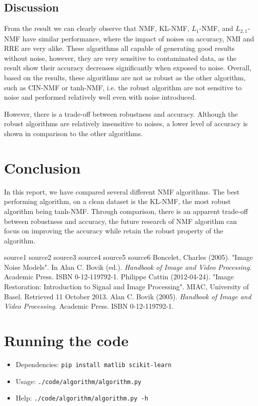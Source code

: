\documentclass{article} %
\begin{document}
\subsection{Discussion}
From the result we can clearly observe that NMF, KL-NMF, $L_1$-NMF, and $L_{2,1}$-NMF have similar performance, where the impact of noises on accuracy, NMI and RRE are very alike. These algorithms all capable of generating good results without noise, however, they are very sensitive to contaminated data, as the result show their accuracy decreases significantly when exposed to noise. Overall, based on the results, these algorithms are not as robust as the other algorithm, such as CIN-NMF or tanh-NMF, i.e. the robust algorithm are not sensitive to noise and performed relatively well even with noise introduced.

However, there is a trade-off between robustness and accuracy. Although the robust algorithms are relatively insensitive to noises, a lower level of accuracy is shown in comparison to the other algorithms.

\section{Conclusion}
In this report, we have compared several different NMF algorithms. The best performing algorithm, on a clean dataset is the KL-NMF, the most robust algorithm being tanh-NMF. Through comparison, there is an apparent trade-off between robustness and accuracy, the future research of NMF algorithm can focus on improving the accuracy while retain the robust property of the algorithm.


\begin{thebibliography}{99}
 source1
 source2
 source3
 source4
 source5
 source6
 Boncelet, Charles (2005). "Image Noise Models". In Alan C. Bovik (ed.). \textit{Handbook of Image and Video Processing}. Academic Press. ISBN 0-12-119792-1.
 Philippe Cattin (2012-04-24). "Image Restoration: Introduction to Signal and Image Processing". MIAC, University of Basel. Retrieved 11 October 2013.
 Alan C. Bovik (2005). \textit{Handbook of Image and Video Processing}. Academic Press. ISBN 0-12-119792-1.
\end{thebibliography}

\appendix

\section{Running the code}
\begin{itemize}
\item Dependencies: \texttt{pip install matlib scikit-learn}
\item Usage: \texttt{./code/algorithm/algorithm.py}
\item Help: \texttt{./code/algorithm/algorithm.py -h}
\end{itemize}
\end{document}
